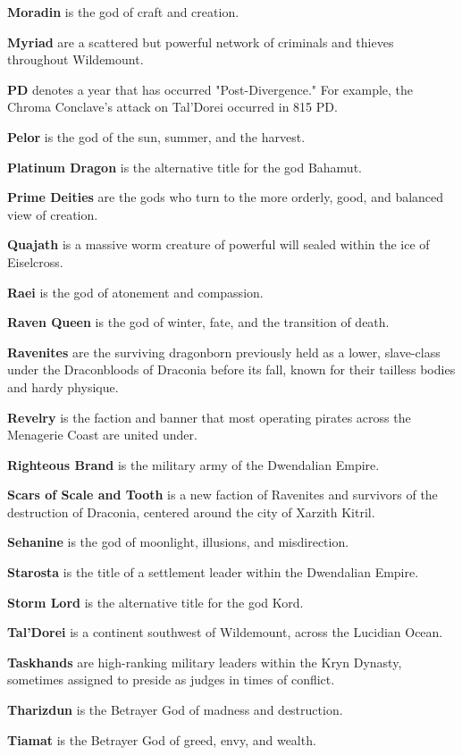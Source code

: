 \documentclass[10pt,a4paper,twoside,bg=print,twocolumn,openany,nodeprecatedcode]{dndbook}
\begin{document}
\textbf{Moradin} is the god of craft and creation.

\textbf{Myriad} are a scattered but powerful network of criminals and thieves throughout Wildemount.

\textbf{PD} denotes a year that has occurred "Post-Divergence." For example, the Chroma Conclave's attack on Tal'Dorei occurred in 815 PD.

\textbf{Pelor} is the god of the sun, summer, and the harvest.

\textbf{Platinum Dragon} is the alternative title for the god Bahamut.

\textbf{Prime Deities} are the gods who turn to the more orderly, good, and balanced view of creation.

\textbf{Quajath} is a massive worm creature of powerful will sealed within the ice of Eiselcross.

\textbf{Raei} is the god of atonement and compassion.

\textbf{Raven Queen} is the god of winter, fate, and the transition of death.

\textbf{Ravenites} are the surviving dragonborn previously held as a lower, slave-class under the Draconbloods of Draconia before its fall, known for their tailless bodies and hardy physique.

\textbf{Revelry} is the faction and banner that most operating pirates across the Menagerie Coast are united under.

\textbf{Righteous Brand} is the military army of the Dwendalian Empire.

\textbf{Scars of Scale and Tooth} is a new faction of Ravenites and survivors of the destruction of Draconia, centered around the city of Xarzith Kitril.

\textbf{Sehanine} is the god of moonlight, illusions, and misdirection.

\textbf{Starosta} is the title of a settlement leader within the Dwendalian Empire.

\textbf{Storm Lord} is the alternative title for the god Kord.

\textbf{Tal'Dorei} is a continent southwest of Wildemount, across the Lucidian Ocean.

\textbf{Taskhands} are high-ranking military leaders within the Kryn Dynasty, sometimes assigned to preside as judges in times of conflict.

\textbf{Tharizdun} is the Betrayer God of madness and destruction.

\textbf{Tiamat} is the Betrayer God of greed, envy, and wealth.
\end{document}
